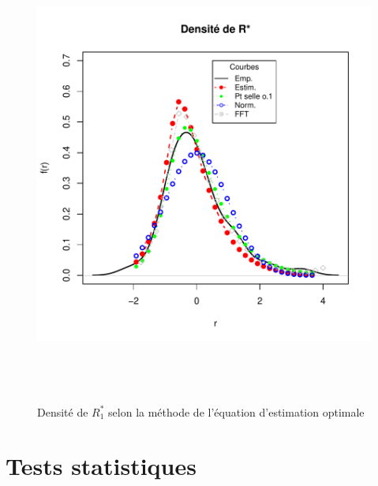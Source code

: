 \begin{figure}[!ht]
  \centering
  \includegraphics[height=6in,
  width=6in]{../graphiques/ABBEYN-densiteGALmu-5.pdf}
  \caption{Densité de $R_1^{*}$ selon la méthode de l'équation
    d'estimation optimale}
  \label{fig:densite3R1}
\end{figure}

\clearpage
\section{Tests statistiques}
\label{sec:tests-statistiques}

